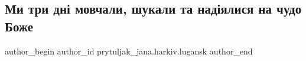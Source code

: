  
 
 
 
 

\subsection{Ми три дні мовчали, шукали та надіялися на чудо Боже}
\label{sec:17_01_2023.fb.prytuljak_jana.harkiv.lugansk.1.mi_tri_dn__movchali_}

\ifcmt
 author_begin
   author_id prytuljak_jana.harkiv.lugansk
 author_end
\fi
